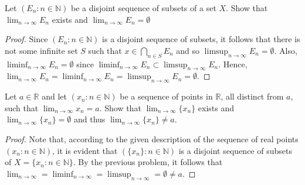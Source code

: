 \documentclass[12pt]{article}
\newcommand{\N}{\mathbb{N}}
\newcommand{\R}{\mathbb{R}}
\newenvironment{problem}[2][Problem]{\begin{trivlist}
		\item[\hskip \labelsep {\bfseries #1}\hskip \labelsep {\bfseries #2.}]}{\end{trivlist}}
\begin{document}
\begin{problem}{1.3}
	Let $\left(E_{n}: n\in \N\right)$ be a disjoint sequence of subsets of a set $X$. Show that $\lim_{n \to \infty} E_{n}$ exists and $\lim_{n \to \infty} E_{n} = \emptyset$
	\begin{proof}
		Since $\left(E_{n}: n\in \N\right)$ is a disjoint sequence of subsets, it follows that there is not some infinite set $S$ such that $x\in \bigcap_{n\in S}E_{n}$ and so $ \limsup_{n\to \infty} E_{n} = \emptyset$. Also, $\liminf_{n \to \infty} E_{n} = \emptyset$ since $\liminf_{n\to \infty} E_{n} \subset \limsup_{n\to \infty} E_{n}$. Hence, $\lim_{n \to \infty} E_{n} = \liminf_{n\to \infty} E_{n} = \limsup_{n\to \infty} E_{n} = \emptyset$. 
	\end{proof}
\end{problem}

\begin{problem}{1.4}
	Let $a\in \R$ and let $\left(x_{n}: n\in \N\right)$ be a sequence of points in $\R$, all distinct from $a$, such that $\lim_{n\to \infty} x_{n} = a$. Show that $\lim_{n \to \infty} \{x_{n}\}$ exists and $\lim_{n \to \infty}\{x_{n}\} = \emptyset$ and thus $\lim_{n \to \infty}\{x_{n}\} \neq a$.
	\begin{proof}
		Note that, according to the given description of the sequence of real points $\left(x_{n}: n\in \N\right)$, it is evident that $\left(\{x_{n}\}:n\in \N\right)$ is a disjoint sequence of subsets of $X = \{x_{n}:n\in \N\}$. By the previous problem, it follows that $\lim_{n \to \infty} = \liminf_{n\to \infty} = \limsup_{n\to \infty} = \emptyset \neq a$.
	\end{proof}
\end{problem}
\end{document}
